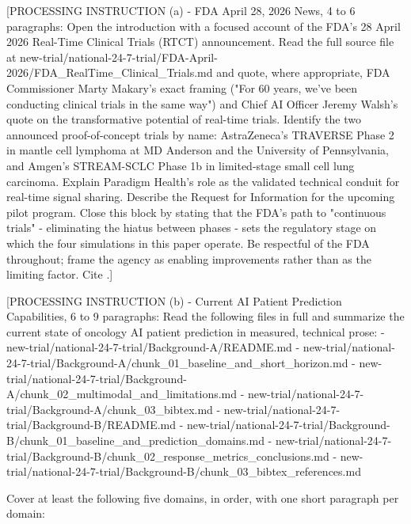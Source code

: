 
[PROCESSING INSTRUCTION (a) - FDA April 28, 2026 News, 4 to 6 paragraphs:
Open the introduction with a focused account of the FDA's 28 April 2026
Real-Time Clinical Trials (RTCT) announcement. Read the full source file
at new-trial/national-24-7-trial/FDA-April-2026/FDA\_RealTime\_Clinical\_Trials.md
and quote, where appropriate, FDA Commissioner Marty Makary's exact framing
("For 60 years, we've been conducting clinical trials in the same way") and
Chief AI Officer Jeremy Walsh's quote on the transformative potential of
real-time trials. Identify the two announced proof-of-concept trials by
name: AstraZeneca's TRAVERSE Phase 2 in mantle cell lymphoma at MD Anderson
and the University of Pennsylvania, and Amgen's STREAM-SCLC Phase 1b in
limited-stage small cell lung carcinoma. Explain Paradigm Health's role as
the validated technical conduit for real-time signal sharing. Describe the
Request for Information for the upcoming pilot program. Close this block
by stating that the FDA's path to "continuous trials" - eliminating the
hiatus between phases - sets the regulatory stage on which the four
simulations in this paper operate. Be respectful of the FDA throughout;
frame the agency as enabling improvements rather than as the limiting
factor. Cite \cite{fda2026realtime}.]

[PROCESSING INSTRUCTION (b) - Current AI Patient Prediction Capabilities,
6 to 9 paragraphs: Read the following files in full and summarize the
current state of oncology AI patient prediction in measured, technical
prose:
- new-trial/national-24-7-trial/Background-A/README.md
- new-trial/national-24-7-trial/Background-A/chunk\_01\_baseline\_and\_short\_horizon.md
- new-trial/national-24-7-trial/Background-A/chunk\_02\_multimodal\_and\_limitations.md
- new-trial/national-24-7-trial/Background-A/chunk\_03\_bibtex.md
- new-trial/national-24-7-trial/Background-B/README.md
- new-trial/national-24-7-trial/Background-B/chunk\_01\_baseline\_and\_prediction\_domains.md
- new-trial/national-24-7-trial/Background-B/chunk\_02\_response\_metrics\_conclusions.md
- new-trial/national-24-7-trial/Background-B/chunk\_03\_bibtex\_references.md

Cover at least the following five domains, in order, with one short
paragraph per domain:

